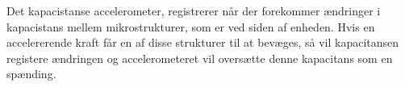 Det kapacistanse accelerometer, registrerer når der forekommer ændringer i kapacistans mellem mikrostrukturer, som er ved siden af enheden. Hvis en accelererende kraft får en af disse strukturer til at bevæges, så vil kapacitansen registere ændringen og accelerometeret vil oversætte denne kapacitans som en spænding.  \citep{Goodrich2013}
